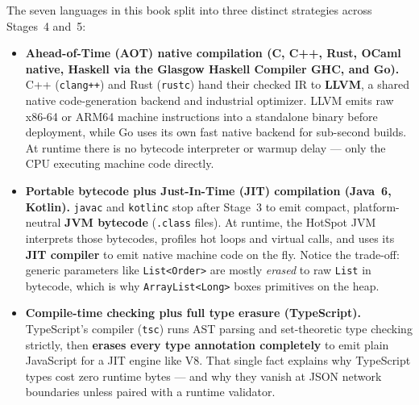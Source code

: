 The seven languages in this book split into three distinct strategies across Stages~4 and~5:

\begin{itemize}
  \item \textbf{Ahead-of-Time (AOT) native compilation (C, C++, Rust, OCaml native, Haskell via the Glasgow Haskell Compiler \textbf{GHC}, and Go).} C++ (\texttt{clang++}) and Rust (\texttt{rustc}) hand their checked IR to \textbf{LLVM}, a shared native code-generation backend and industrial optimizer. LLVM emits raw x86-64 or ARM64 machine instructions into a standalone binary before deployment, while Go uses its own fast native backend for sub-second builds. At runtime there is no bytecode interpreter or warmup delay --- only the CPU executing machine code directly.
  \item \textbf{Portable bytecode plus Just-In-Time (JIT) compilation (Java~6, Kotlin).} \texttt{javac} and \texttt{kotlinc} stop after Stage~3 to emit compact, platform-neutral \textbf{JVM bytecode} (\texttt{.class} files). At runtime, the HotSpot JVM interprets those bytecodes, profiles hot loops and virtual calls, and uses its \textbf{JIT compiler} to emit native machine code on the fly. Notice the trade-off: generic parameters like \texttt{List<Order>} are mostly \emph{erased} to raw \texttt{List} in bytecode, which is why \texttt{ArrayList<Long>} boxes primitives on the heap.
  \item \textbf{Compile-time checking plus full type erasure (TypeScript).} TypeScript's compiler (\texttt{tsc}) runs AST parsing and set-theoretic type checking strictly, then \textbf{erases every type annotation completely} to emit plain JavaScript for a JIT engine like V8. That single fact explains why TypeScript types cost zero runtime bytes --- and why they vanish at JSON network boundaries unless paired with a runtime validator.
\end{itemize}

